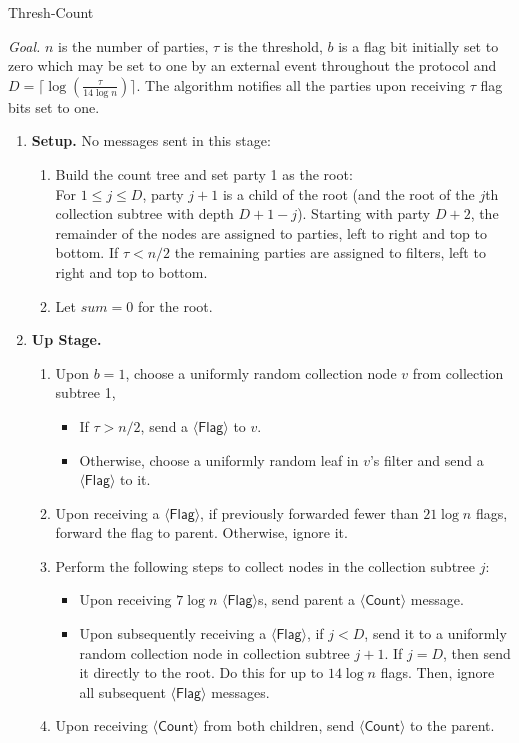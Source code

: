\documentclass[11pt,letter]{article}
\newcommand{\alg}[1]{\mbox{\textsf{#1}}}
\theoremstyle{mytheoremstyle}
\let\savedCaption=\caption
\renewcommand*{\caption}[1]{\savedCaption[#1]{~#1}}
\newcommand{\algfont}{}
\newcommand{\dcl}{D}
\newcommand{\flag}{$\langle\mathsf{Flag}\rangle$\xspace}
\newcommand{\countm}{$\langle\mathsf{Count}\rangle$\xspace}
\begin{document}
\begin{algorithm}
	\caption{\alg{Thresh-Count}}
	\medskip
	\algfont
	\textit{Goal.} $n$ is the number of parties, $\tau$ is the threshold, $b$ is a flag bit initially set to zero which may be set to one by an external event throughout the protocol and $\dcl = \lceil \log(\frac{\tau}{14\log{n}})\rceil$. The algorithm notifies all the parties upon receiving $\tau$ flag bits set to one.

	\begin{enumerate}
		\item \textbf{Setup.} No messages sent in this stage:
		\begin{enumerate}
			\item Build the count tree and set party 1 as the root:\\
			 For $1\le j \le \dcl$, party $j+1$ is a child of the root (and the root of the $j$th collection subtree with depth $\dcl+1-j$). Starting with party $\dcl+2$, the remainder of the nodes are assigned to parties, left to right and top to bottom. If $\tau < n/2$ the remaining parties are assigned to filters, left to right and top to bottom.
			\item Let $sum = 0$ for the root.
		\end{enumerate}
		\item \textbf{Up Stage.}
		\begin{enumerate}
			\item Upon $b=1$, choose a uniformly random collection node $v$ from collection subtree 1,
			\begin{itemize}
				\item If $\tau > n/2$, send a \flag to $v$.
				\item Otherwise, choose a uniformly random leaf in $v$'s filter and send a \flag to it.
			\end{itemize}
			\item Upon receiving a \flag, if previously forwarded
			fewer than $21\log{n}$ flags, forward the flag to parent. Otherwise, ignore it.
			\item Perform the following steps to collect nodes in the collection subtree $j$:
			\begin{itemize}
				\item Upon receiving $7\log{n}$ {\flag}s,
				send parent a \countm message.
				\item Upon subsequently receiving a \flag, if $j<\dcl$, send it to a uniformly random collection node in collection subtree $j+1$.
				If $j=\dcl$, then send it directly to the root. Do this for up to $14 \log n$ flags. Then, ignore all subsequent \flag messages.
			\end{itemize}
			\item Upon receiving \countm from both children, send \countm to the parent.
			

\end{enumerate}
\end{enumerate}
\end{algorithm}
\end{document}
